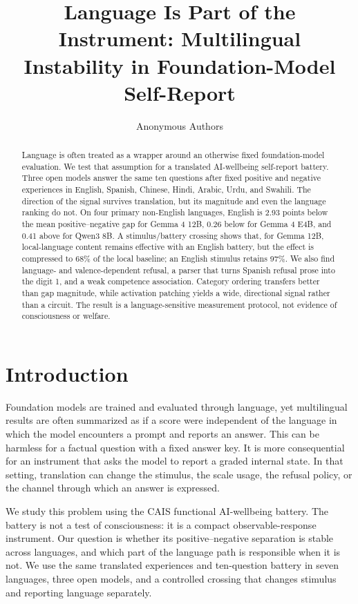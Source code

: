 \documentclass{article}
\title{Language Is Part of the Instrument: Multilingual Instability in Foundation-Model Self-Report}
\author{Anonymous Authors}
\begin{document}
\maketitle

\begin{abstract}
Language is often treated as a wrapper around an otherwise fixed foundation-model evaluation. We test that assumption for a translated AI-wellbeing self-report battery. Three open models answer the same ten questions after fixed positive and negative experiences in English, Spanish, Chinese, Hindi, Arabic, Urdu, and Swahili. The direction of the signal survives translation, but its magnitude and even the language ranking do not. On four primary non-English languages, English is 2.93 points below the mean positive--negative gap for Gemma 4 12B, 0.26 below for Gemma 4 E4B, and 0.41 above for Qwen3 8B. A stimulus/battery crossing shows that, for Gemma 12B, local-language content remains effective with an English battery, but the effect is compressed to 68\% of the local baseline; an English stimulus retains 97\%. We also find language- and valence-dependent refusal, a parser that turns Spanish refusal prose into the digit 1, and a weak competence association. Category ordering transfers better than gap magnitude, while activation patching yields a wide, directional signal rather than a circuit. The result is a language-sensitive measurement protocol, not evidence of consciousness or welfare.
\end{abstract}

\section{Introduction}

Foundation models are trained and evaluated through language, yet multilingual results are often summarized as if a score were independent of the language in which the model encounters a prompt and reports an answer. This can be harmless for a factual question with a fixed answer key. It is more consequential for an instrument that asks the model to report a graded internal state. In that setting, translation can change the stimulus, the scale usage, the refusal policy, or the channel through which an answer is expressed.

We study this problem using the CAIS functional AI-wellbeing battery. The battery is not a test of consciousness: it is a compact observable-response instrument. Our question is whether its positive--negative separation is stable across languages, and which part of the language path is responsible when it is not. We use the same translated experiences and ten-question battery in seven languages, three open models, and a controlled crossing that changes stimulus and reporting language separately.
\end{document}

